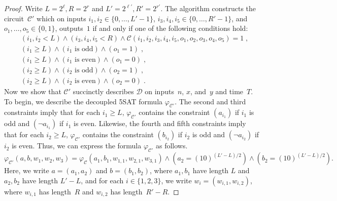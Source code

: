 \documentclass[11pt]{article}
\theoremstyle{definition}
\newcommand{\decider}{\mathcal{D}}
\newcommand{\circuit}{\mathcal{C}}
\begin{document}
\begin{proof}
  Write $L = 2^\ell, R = 2^r$ and $L' = 2^{\ell'}, R' = 2^{r'}$.
  The algorithm constructs the circuit~$\circuit'$ which on inputs $i_1, i_2 \in
  \{0, \ldots, L'-1\}$, $i_3, i_4, i_5 \in \{0, \ldots, R'-1\}$, and $o_1,
  \ldots, o_5 \in \{0, 1\}$, outputs~$1$ if and only if one of the following
  conditions hold:
  \begin{align*}
    & (i_1, i_2 < L) \land (i_3, i_4, i_5 < R) \land
      \circuit(i_1, i_2, i_3, i_4, i_5, o_1, o_2, o_3, o_4, o_5) = 1\;,\\
    & (i_1 \geq L) \land (\text{$i_1$ is odd}) \land (o_1 = 1)\;,\\
    & (i_1 \geq L) \land (\text{$i_1$ is even}) \land (o_1 = 0)\;,\\
    & (i_2 \geq L) \land (\text{$i_2$ is odd}) \land (o_2 = 1)\;,\\
    & (i_2 \geq L) \land (\text{$i_2$ is even}) \land (o_2 = 0)\;.
  \end{align*}
  Now we show that $\circuit'$ succinctly describes $\decider$ on inputs~$n$,
  $x$, and~$y$ and time~$T$.
  To begin, we describe the decoupled 5SAT formula $\varphi_{\circuit'}$.
  The second and third constraints imply that for each $i_1 \geq L$,
  $\varphi_{\circuit'}$ contains the constraint $(a_{i_1})$ if $i_1$ is odd and
  $(\neg a_{i_1})$ if $i_1$ is even.
  Likewise, the fourth and fifth constraints imply that for each $i_2 \geq L$,
  $\varphi_{\circuit'}$ contains the constraint $(b_{i_2})$ if $i_2$ is odd and
  $(\neg a_{i_2})$ if $i_2$ is even.
  Thus, we can express the formula $\varphi_{\circuit'}$ as follows.
  \begin{equation}\label{eq:write-formula}
    \varphi_{\circuit'}(a, b, w_1, w_2, w_3)
    = \varphi_{\circuit}(a_1, b_1, w_{1, 1}, w_{2, 1} ,w_{3, 1})
  	\land (a_2 = (10)^{(L'-L)/2}) \land (b_2 = (10)^{(L'-L)/2}).
  \end{equation}
  Here, we write $a = (a_1, a_2)$ and $b = (b_1, b_2)$, where $a_1, b_1$ have
  length $L$ and $a_2, b_2$ have length $L' - L$, and for each $i \in \{1, 2,
  3\}$, we write $w_i = (w_{i, 1}, w_{i, 2})$, where $w_{i, 1}$ has length~$R$
  and $w_{i, 2}$ has length~$R'-R$.
  

\end{proof}
\end{document}
